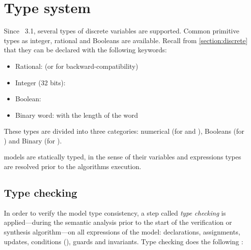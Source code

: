 \section{Type system}\label{section:type_system}

Since \imitator{}~3.1, several types of discrete variables are supported.
Common primitive types as integer, rational and Booleans are available.
Recall from \cref{section:discrete} that they can be declared with the following keywords:

\begin{itemize}
	\item Rational:  (or  for backward-compatibility)
	\item Integer (32 bits): 
	\item Boolean: 
	\item Binary word:  with  the length of the word
\end{itemize}

These types are divided into three categories: numerical (for  and ), Booleans (for ) and Binary (for ).

\imitator{} models are statically typed, in the sense of their variables and expressions types are resolved prior to the algorithms execution.


\subsection{Type checking}

In order to verify the model type consistency, a step called \emph{type checking} is applied---during the semantic analysis prior to the start of the verification or synthesis algorithm---on all expressions of the model: declarations, assignments, updates, conditions (), guards and invariants.
Type checking does the following :

